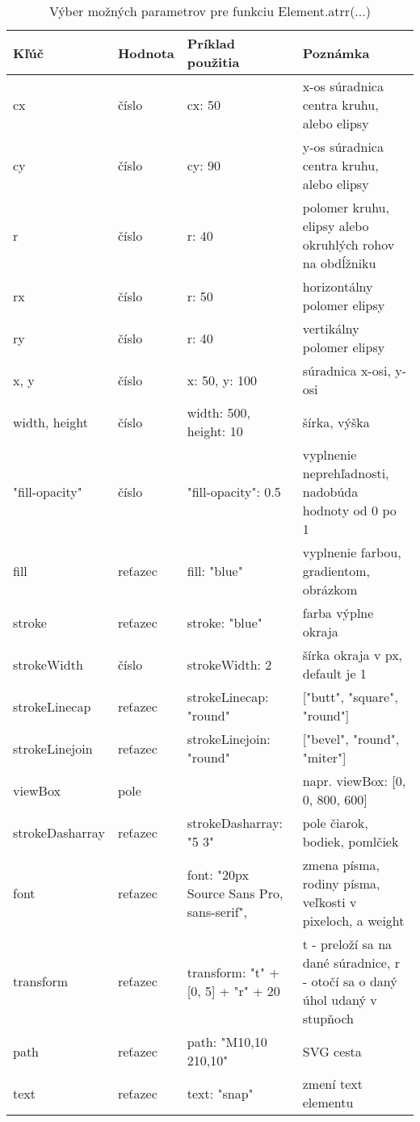 \begin{table}[tp]
	\begin{center}
	
	\begin{tabular}{|l|l|p{4cm}|p{6cm}|}
	\hline \textbf{	Kľúč} & \textbf{Hodnota} & \textbf{Príklad použitia} & \textbf{Poznámka} \\ 
		\hline cx & číslo & cx: 50 & x-os súradnica centra kruhu, alebo elipsy \\ 
		\hline cy & číslo & cy: 90 & y-os súradnica centra kruhu, alebo elipsy \\ 
		\hline r & číslo & r: 40 & polomer kruhu, elipsy alebo okruhlých rohov na obdĺžniku \\ 
		\hline rx & číslo & r: 50 & horizontálny polomer elipsy \\ 
		\hline ry & číslo & r: 40 & vertikálny polomer elipsy \\ 
		\hline x, y & číslo & x: 50, y: 100 & súradnica x-osi, y-osi  \\ 
			\hline width, height & číslo & width: 500, height: 10 & šírka, výška \\ 
			\hline "fill-opacity" & číslo & "fill-opacity": 0.5 & vyplnenie neprehľadnosti, nadobúda hodnoty od 0 po 1 \\ 
		\hline fill & reťazec & fill: "blue" & vyplnenie farbou, gradientom, obrázkom \\ 
		\hline stroke & reťazec & stroke: "blue" & farba výplne okraja \\ 
		\hline strokeWidth & číslo & strokeWidth: 2 & šírka okraja v px, default je 1 \\ 
		\hline strokeLinecap & reťazec & strokeLinecap: "round" & ["butt", "square", "round"] \\ 
		\hline strokeLinejoin & reťazec &  strokeLinejoin: "round" & ["bevel", "round", "miter"] \\ 
		\hline viewBox & pole & & napr. viewBox: [0, 0, 800, 600]
		  \\ 
		\hline strokeDasharray & reťazec &    strokeDasharray: "5 3" & pole čiarok, bodiek, pomlčiek \\ 
		\hline font & reťazec &   font: "20px Source Sans Pro, sans-serif", & zmena písma, rodiny písma, veľkosti v pixeloch, a weight \\ 
		\hline transform & reťazec & transform: "t" + [0, 5] +
		"r" + 20 & t - preloží sa na dané súradnice, r - otočí sa o daný úhol udaný v stupňoch \\ 
			\hline path & reťazec & path: "M10,10 210,10" & SVG cesta \\ 
			\hline text & reťazec & text: "snap" & zmení text elementu \\ 
		\hline 
	\end{tabular} 
	
		\end{center}
		\caption{Výber možných parametrov pre funkciu Element.atrr(...)}
		\label{parametre:attr}
\end{table}



